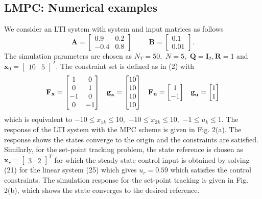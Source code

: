 \documentclass{article}
\begin{document}
\subsection{LMPC: Numerical examples}
We consider an LTI system with system and input matrices as follows
\begin{equation}
    \textbf{A}=\left[\begin{matrix} 0.9 &0.2 \\-0.4 & 0.8
\end{matrix}\right] \hspace{1cm} \textbf{B}=\left[\begin{matrix} 0.1 \\0.01
\end{matrix}\right].
\end{equation}
 The simulation parameters are chosen as $N_{T}=50,$ $N=5,$ $\textbf{Q}=\textbf{I}_{2},\textbf{R}=1$ and $\textbf{x}_{0}=\left[\begin{matrix} 10 & 5
\end{matrix}\right]^{T}.$ The constraint set is defined as in (2) with 
\begin{equation}
    \textbf{F}_{\textbf{x}}=\left[\begin{matrix} 1 &0 \\0 & 1\\-1 &0 \\0&-1
\end{matrix}\right] \hspace{0.3cm} \textbf{g}_{\textbf{x}}=\left[\begin{matrix} 10 \\10\\10\\10
\end{matrix}\right]\hspace{0.3cm} \textbf{F}_{\textbf{u}}=\left[\begin{matrix} 1\\-1 \end{matrix} \right] \hspace{0.3cm} \textbf{g}_{\textbf{u}}=\left[\begin{matrix} 1\\1 \end{matrix} \right]
\end{equation}
which is equivalent to $-10 \leq x_{1k} \leq 10,$ $-10 \leq x_{2k} \leq 10,$ $-1 \leq u_{k} \leq 1.$
    The response of the LTI system with the MPC scheme is given in Fig. 2(a). The response shows the states converge to the origin and the constraints are satisfied. Similarly, for the set-point tracking problem, the state reference is chosen as $\textbf{x}_{r}=\left[\begin{matrix}3&2 \end{matrix} \right]^{T}$ for which the steady-state control input is obtained by solving (21) for the linear system (25) which gives $u_{r}=0.59$ which satisfies the control constraints. The simulation response for the set-point tracking is given in Fig. 2(b), which shows the state converges to the desired reference.
\end{document}
